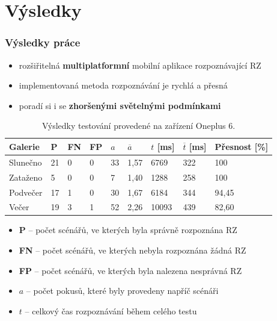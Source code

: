 \documentclass{beamer}
\begin{document}
\section{Výsledky}
\begin{frame}
\frametitle{Výsledky práce}
\begin{itemize}
    \item rozšiřitelná \textbf{multiplatformní} mobilní aplikace rozpoznávající RZ
    \item implementovaná metoda rozpoznávání je rychlá a přesná
    \item poradí si i se \textbf{zhoršenými světelnými podmínkami}
\end{itemize}

\pause

\begin{table}[!ht]
    \centering
        \begin{tabular}{| l | l | l | l | l | l | l | l | l |}
            \hline
            Galerie & P & FN & FP & $a$ & $\overline{a}$ & $t$ [ms] & $\overline{t}$ [ms] & Přesnost [\%]  \\ \hline \hline
            Slunečno & 21 & 0 & 0 & 33 & 1,57 & 6769 & 322  & 100 \\ \hline
            Zataženo & 5 & 0 & 0 & 7 & 1,40 & 1288 & 258  & 100 \\ \hline
            Podvečer & 17 & 1 & 0 & 30 & 1,67 & 6184 & 344  & 94,45 \\ \hline
            Večer & 19 & 3 & 1 & 52 & 2,26 & 10093 & 439  & 82,60 \\ \hline
        \end{tabular}
        \caption{\label{tab:table-name}Výsledky testování provedené na zařízení Oneplus 6.}
\end{table}

\pause

\begingroup
    \fontsize{8pt}{12pt}\selectfont
    \begin{itemize}
        \item \textbf{P} -- počet scénářů, ve kterých byla správně rozpoznána RZ
        \item \textbf{FN} -- počet scénářů, ve kterých nebyla rozpoznána žádná RZ
        \item \textbf{FP} -- počet scénářů, ve kterých byla nalezena nesprávná RZ
        \item \textbf{$a$} -- počet pokusů, které byly provedeny napříč scénáři
        \item \textbf{$t$} -- celkový čas rozpoznávání během celého testu
    \end{itemize}
\endgroup

\end{frame}
\end{document}
